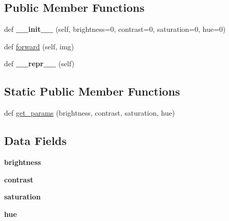 \subsection*{Public Member Functions}
\begin{DoxyCompactItemize}
\item 
\mbox{\label{classtorchvision_1_1transforms_1_1transforms_1_1ColorJitter_ae63a5328db3b432064018849d49487b1}} 
def {\bfseries \+\_\+\+\_\+init\+\_\+\+\_\+} (self, brightness=0, contrast=0, saturation=0, hue=0)
\item 
def \hyperlink{classtorchvision_1_1transforms_1_1transforms_1_1ColorJitter_ad5eeb45fc15659bf39ed9091b43491ac}{forward} (self, img)
\item 
\mbox{\label{classtorchvision_1_1transforms_1_1transforms_1_1ColorJitter_a4fe12c5ccb3a007e55f711ec27fd78b2}} 
def {\bfseries \+\_\+\+\_\+repr\+\_\+\+\_\+} (self)
\end{DoxyCompactItemize}
\subsection*{Static Public Member Functions}
\begin{DoxyCompactItemize}
\item 
def \hyperlink{classtorchvision_1_1transforms_1_1transforms_1_1ColorJitter_a05259a1f267e59cc310ed99e9f5b0415}{get\+\_\+params} (brightness, contrast, saturation, hue)
\end{DoxyCompactItemize}
\subsection*{Data Fields}
\begin{DoxyCompactItemize}
\item 
\mbox{\label{classtorchvision_1_1transforms_1_1transforms_1_1ColorJitter_af9f95aac90ffe86db4540c7b464a9921}} 
{\bfseries brightness}
\item 
\mbox{\label{classtorchvision_1_1transforms_1_1transforms_1_1ColorJitter_a1cccdebf427a007506f18ddef06f3084}} 
{\bfseries contrast}
\item 
\mbox{\label{classtorchvision_1_1transforms_1_1transforms_1_1ColorJitter_a536e3e4e080b1ce8f15ec21505dafa97}} 
{\bfseries saturation}
\item 
\mbox{\label{classtorchvision_1_1transforms_1_1transforms_1_1ColorJitter_a98a0889152492e92db80a75e0cedd9f3}} 
{\bfseries hue}
\end{DoxyCompactItemize}


